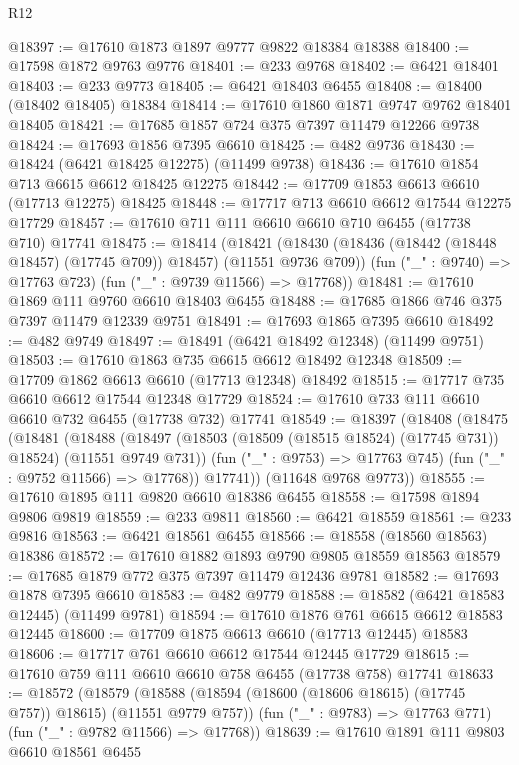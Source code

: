 \begin{lexlean}{R12}
\begin{coremodule}
{{{{{{{{{{{{{{{{{{{{{{{{{{{{{{{{{{{{{{{{{{{{{{{{{{{{{{{{{{{{{{{{{{{{{{{{{{{{{{{{{{@18397 := @17610 @1873 @1897 @9777 @9822 @18384 @18388
@18400 := @17598 @1872 @9763 @9776
@18401 := @233 @9768
@18402 := @6421 @18401
@18403 := @233 @9773
@18405 := @6421 @18403 @6455
@18408 := @18400 (@18402 @18405) @18384
@18414 := @17610 @1860 @1871 @9747 @9762 @18401 @18405
@18421 := @17685 @1857 @724 @375 @7397 @11479 @12266 @9738
@18424 := @17693 @1856 @7395 @6610
@18425 := @482 @9736
@18430 := @18424 (@6421 @18425 @12275) (@11499 @9738)
@18436 := @17610 @1854 @713 @6615 @6612 @18425 @12275
@18442 := @17709 @1853 @6613 @6610 (@17713 @12275) @18425
@18448 := @17717 @713 @6610 @6612 @17544 @12275 @17729
@18457 := @17610 @711 @111 @6610 @6610 @710 @6455 (@17738 @710) @17741
@18475 := @18414
    (@18421
      (@18430 (@18436 (@18442 (@18448 @18457) (@17745 @709)) @18457) (@11551 @9736 @709))
      (fun ("_" : @9740) => @17763 @723)
      (fun ("_" : @9739 @11566) => @17768))
@18481 := @17610 @1869 @111 @9760 @6610 @18403 @6455
@18488 := @17685 @1866 @746 @375 @7397 @11479 @12339 @9751
@18491 := @17693 @1865 @7395 @6610
@18492 := @482 @9749
@18497 := @18491 (@6421 @18492 @12348) (@11499 @9751)
@18503 := @17610 @1863 @735 @6615 @6612 @18492 @12348
@18509 := @17709 @1862 @6613 @6610 (@17713 @12348) @18492
@18515 := @17717 @735 @6610 @6612 @17544 @12348 @17729
@18524 := @17610 @733 @111 @6610 @6610 @732 @6455 (@17738 @732) @17741
@18549 := @18397
    (@18408
      (@18475
        (@18481
          (@18488
            (@18497 (@18503 (@18509 (@18515 @18524) (@17745 @731)) @18524) (@11551 @9749 @731))
            (fun ("_" : @9753) => @17763 @745)
            (fun ("_" : @9752 @11566) => @17768))
          @17741))
      (@11648 @9768 @9773))
@18555 := @17610 @1895 @111 @9820 @6610 @18386 @6455
@18558 := @17598 @1894 @9806 @9819
@18559 := @233 @9811
@18560 := @6421 @18559
@18561 := @233 @9816
@18563 := @6421 @18561 @6455
@18566 := @18558 (@18560 @18563) @18386
@18572 := @17610 @1882 @1893 @9790 @9805 @18559 @18563
@18579 := @17685 @1879 @772 @375 @7397 @11479 @12436 @9781
@18582 := @17693 @1878 @7395 @6610
@18583 := @482 @9779
@18588 := @18582 (@6421 @18583 @12445) (@11499 @9781)
@18594 := @17610 @1876 @761 @6615 @6612 @18583 @12445
@18600 := @17709 @1875 @6613 @6610 (@17713 @12445) @18583
@18606 := @17717 @761 @6610 @6612 @17544 @12445 @17729
@18615 := @17610 @759 @111 @6610 @6610 @758 @6455 (@17738 @758) @17741
@18633 := @18572
    (@18579
      (@18588 (@18594 (@18600 (@18606 @18615) (@17745 @757)) @18615) (@11551 @9779 @757))
      (fun ("_" : @9783) => @17763 @771)
      (fun ("_" : @9782 @11566) => @17768))
@18639 := @17610 @1891 @111 @9803 @6610 @18561 @6455
}}}}}}}}}}}}}}}}}}}}}}}}}}}}}}}}}}}}}}}}}}}}}}}}}}}}}}}}}}}}}}}}}}}}}}}}}}}}}}}}}}
\end{coremodule}
\end{lexlean}
